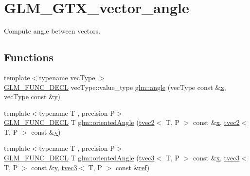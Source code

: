 \hypertarget{group__gtx__vector__angle}{}\section{G\+L\+M\+\_\+\+G\+T\+X\+\_\+vector\+\_\+angle}
\label{group__gtx__vector__angle}


Compute angle between vectors.  


\subsection*{Functions}
\begin{DoxyCompactItemize}
\item 
{\footnotesize template$<$typename vec\+Type $>$ }\\\mbox{\hyperlink{setup_8hpp_ab2d052de21a70539923e9bcbf6e83a51}{G\+L\+M\+\_\+\+F\+U\+N\+C\+\_\+\+D\+E\+CL}} vec\+Type\+::value\+\_\+type \mbox{\hyperlink{group__gtx__vector__angle_gab8691008a2536b681b711211816c14f7}{glm\+::angle}} (vec\+Type const \&\mbox{\hyperlink{glad_8h_a92d0386e5c19fb81ea88c9f99644ab1d}{x}}, vec\+Type const \&\mbox{\hyperlink{glad_8h_a66ddd433d2cacfe27f5906b7e86faeed}{y}})
\item 
{\footnotesize template$<$typename T , precision P$>$ }\\\mbox{\hyperlink{setup_8hpp_ab2d052de21a70539923e9bcbf6e83a51}{G\+L\+M\+\_\+\+F\+U\+N\+C\+\_\+\+D\+E\+CL}} T \mbox{\hyperlink{group__gtx__vector__angle_ga82a19d474be13c92c7b10caab42a5a72}{glm\+::oriented\+Angle}} (\mbox{\hyperlink{structglm_1_1tvec2}{tvec2}}$<$ T, P $>$ const \&\mbox{\hyperlink{glad_8h_a92d0386e5c19fb81ea88c9f99644ab1d}{x}}, \mbox{\hyperlink{structglm_1_1tvec2}{tvec2}}$<$ T, P $>$ const \&\mbox{\hyperlink{glad_8h_a66ddd433d2cacfe27f5906b7e86faeed}{y}})
\item 
{\footnotesize template$<$typename T , precision P$>$ }\\\mbox{\hyperlink{setup_8hpp_ab2d052de21a70539923e9bcbf6e83a51}{G\+L\+M\+\_\+\+F\+U\+N\+C\+\_\+\+D\+E\+CL}} T \mbox{\hyperlink{group__gtx__vector__angle_ga7254dba112eff55f55f9544f41cb9ece}{glm\+::oriented\+Angle}} (\mbox{\hyperlink{structglm_1_1tvec3}{tvec3}}$<$ T, P $>$ const \&\mbox{\hyperlink{glad_8h_a92d0386e5c19fb81ea88c9f99644ab1d}{x}}, \mbox{\hyperlink{structglm_1_1tvec3}{tvec3}}$<$ T, P $>$ const \&\mbox{\hyperlink{glad_8h_a66ddd433d2cacfe27f5906b7e86faeed}{y}}, \mbox{\hyperlink{structglm_1_1tvec3}{tvec3}}$<$ T, P $>$ const \&\mbox{\hyperlink{glad_8h_a083de4c8e32ad3d9059245f26be721de}{ref}})
\end{DoxyCompactItemize}



